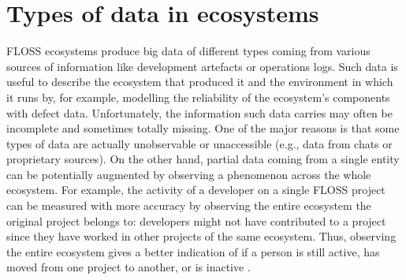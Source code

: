 \chapter{Types of data in ecosystems}

FLOSS ecosystems produce big data of different types coming from various sources of information like development artefacts or  
operations logs. Such data is useful to describe the ecosystem that produced it and the environment in which it runs by, for example, 
modelling the reliability of the ecosystem's components with defect data.
Unfortunately, the information such data carries may often be incomplete and sometimes totally missing. One of the major  reasons is that 
some types of data are actually unobservable or unaccessible (e.g., data from chats or proprietary sources). 
On the other hand,  partial data coming from a single entity can be potentially augmented by
observing a phenomenon across the whole ecosystem. For example, the activity of a developer on a single FLOSS project can
 be measured with more accuracy by observing the entire ecosystem the original project belongs to: developers might not have 
 contributed to a project since they have worked  in other 
projects of the same ecosystem. Thus, observing the entire ecosystem gives a better indication of if a person is still active, 
has moved from one project to another, or is inactive \cite{BogdanXXX}. 

